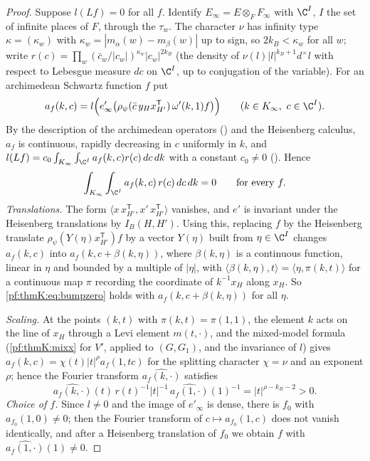 \begin{proof}
Suppose $l(Lf)=0$ for all $f$. Identify $E_\infty=E\otimes_FF_\infty$ with $\C^I$, $I$ the set of infinite places of $F$,
through the $\tau_w$. The character $\nu$ has infinity type $\kappa=(\kappa_w)$ with $\kappa_w=|m_\alpha(w)-m_\beta(w)|$ up
to sign, so $2k_B<\kappa_w$ for all $w$; write $r(c)=\prod_w(\bar c_w/|c_w|)^{\kappa_w}|c_w|^{2k_B}$ (the density of
$\nu(l)|l|^{k_B+1}d^\times l$ with respect to Lebesgue measure $dc$ on $\C^I$, up to conjugation of the variable). For an
archimedean Schwartz function $f$ put
\[
a_f(k,c)=l\Bigl(e'_\infty\bigl(\rho_\psi(\bar c\,y_Hx_{H'}^{\mathsf T})\,\omega'(k,1)f\bigr)\Bigr)\qquad(k\in K_\infty,\ c\in
\C^I).
\]
By the description of the archimedean operators () and the Heisenberg calculus,
$a_f$ is continuous, rapidly decreasing in $c$ uniformly in $k$, and $l(Lf)=c_0\int_{K_\infty}\int_{\C^I}a_f(k,c)r(c)\,dc\,dk$
with a constant $c_0\ne0$ (). Hence
\begin{equation}\label{pf:thmK:eq:bumpzero}
\int_{K_\infty}\int_{\C^I}a_f(k,c)\,r(c)\,dc\,dk=0\qquad\text{for every }f.
\end{equation}
\emph{Translations.} The form $\langle x\,x_{H'}^{\mathsf T},x'\,x_{H'}^{\mathsf T}\rangle$ vanishes, and $e'$ is invariant
under the Heisenberg translations by $I_B(H,H')$. Using this, replacing $f$ by the Heisenberg translate
$\rho_\psi(Y(\eta)x_{H'}^{\mathsf T})f$ by a vector $Y(\eta)$ built from $\eta\in\C^I$ changes $a_f(k,c)$ into
$a_f(k,c+\beta(k,\eta))$, where $\beta(k,\eta)$ is a continuous function, linear in $\eta$ and bounded by a multiple of
$|\eta|$, with $\langle\beta(k,\eta),t\rangle=\langle\eta,\pi(k,t)\rangle$ for a continuous map $\pi$ recording the
coordinate of $k^{-1}x_H$ along $x_H$. So \eqref{pf:thmK:eq:bumpzero} holds with $a_f(k,c+\beta(k,\eta))$ for all $\eta$.

\emph{Scaling.} At the points $(k,t)$ with $\pi(k,t)=\pi(1,1)$, the element $k$ acts on the line of $x_H$ through a Levi
element $m(t,\cdot)$, and the mixed-model formula (\cref{pf:thmK:mixx} for $V'$, applied to $(G,G_1)$, and the invariance
of $l$) gives $a_f(k,c)=\chi(t)|t|^{\rho}a_f(1,tc)$ for the splitting character $\chi=\nu$ and an exponent $\rho$; hence the
Fourier transform $\widehat{a_f(k,\cdot)}$ satisfies
\[
\widehat{a_f(k,\cdot)}(t)\,r(t)^{-1}|t|^{-1}\,\widehat{a_f(1,\cdot)}(1)^{-1}=|t|^{\rho-k_B-2}>0 .
\]
\emph{Choice of $f$.} Since $l\ne0$ and the image of $e'_\infty$ is dense, there is $f_0$ with $a_{f_0}(1,0)\ne0$; then the
Fourier transform of $c\mapsto a_{f_0}(1,c)$ does not vanish identically, and after a Heisenberg translation of $f_0$ we
obtain $f$ with $\widehat{a_f(1,\cdot)}(1)\ne0$.


\end{proof}
